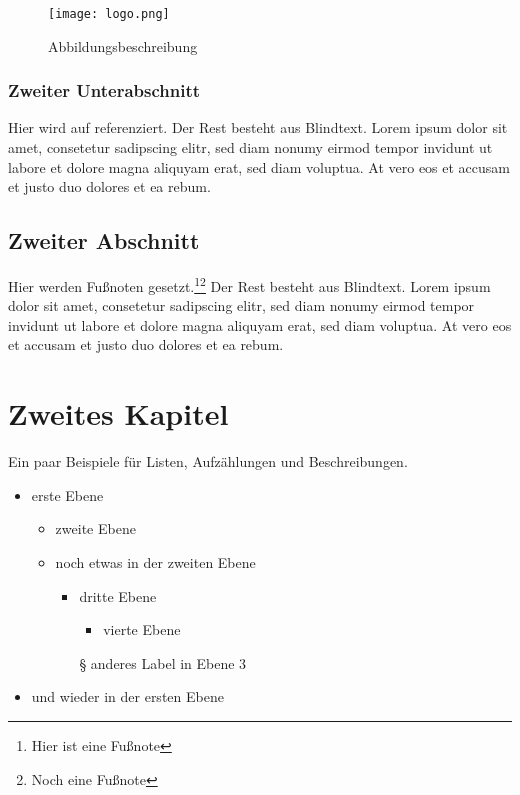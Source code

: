 \documentclass[BCOR=1cm, twoside, ngerman]{scrreprt}
\begin{document}
\begin{figure}
\centering %
\texttt{[image: logo.png]}
\caption{Abbildungsbeschreibung}
\label{fig:logo} %
\end{figure}

\subsection{Zweiter Unterabschnitt}
Hier wird auf  referenziert. Der Rest besteht aus Blindtext. Lorem ipsum dolor sit amet, consetetur sadipscing elitr, sed diam nonumy eirmod tempor invidunt ut labore et dolore magna aliquyam erat, sed diam voluptua. At vero eos et accusam et justo duo dolores et ea rebum.

\section{Zweiter Abschnitt}
Hier werden Fußnoten gesetzt.\footnote{Hier ist eine Fußnote}\footnote{Noch eine Fußnote} Der Rest besteht aus Blindtext. Lorem ipsum dolor sit amet, consetetur sadipscing elitr, sed diam nonumy eirmod tempor invidunt ut labore et dolore magna aliquyam erat, sed diam voluptua. At vero eos et accusam et justo duo dolores et ea rebum.

\chapter{Zweites Kapitel}
Ein paar Beispiele für Listen, Aufzählungen und Beschreibungen.

\begin{itemize}
\item erste Ebene
  \begin{itemize}
  \item zweite Ebene
  \item noch etwas in der zweiten Ebene
    \begin{itemize}
    \item dritte Ebene
      \begin{itemize}
      \item vierte Ebene
      \end{itemize} 
    \item[§] anderes Label in Ebene 3
    \end{itemize}
  \end{itemize}
\item und wieder in der ersten Ebene
\end{itemize}
\end{document}
